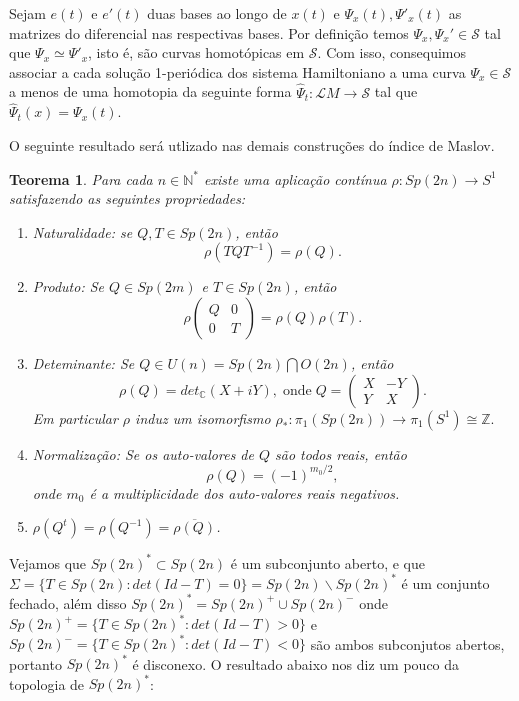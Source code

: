 \documentclass[12pt]{book}
\newtheorem{teorema}{Teorema}[section]
\newcommand{\inteiros}{\mathbb{Z}}
\newcommand{\solucoesperiodicascontrateis}{\mathcal{L}M}
\newcommand{\vermelho}[1]{{\color{red}#1}}
\begin{document}
	Sejam $e(t)$ e $e'(t)$ duas bases ao longo de $x(t)$ e $\Psi_{x}(t), \Psi'_{x}(t)$ as matrizes do diferencial nas respectivas bases. Por definição temos $\Psi_{x}, \Psi_{x}' \in \mathcal{S}$ tal que $\Psi_{x} \simeq \Psi'_{x}$, isto é, \vermelho{são curvas homotópicas em $\mathcal{S}$}. Com isso, consequimos associar a cada solução 1-periódica dos sistema Hamiltoniano a uma curva $\Psi_{x} \in \mathcal{S}$ a menos de uma homotopia da seguinte forma $\hat{\Psi}_{t}:\solucoesperiodicascontrateis \to \mathcal{S}$ tal que $\hat{\Psi}_{t}(x) = \Psi_{x}(t)$.
	
	O seguinte resultado será utlizado nas demais construções do índice de Maslov.
	
	\begin{teorema}
		Para cada $n \in \mathbb{N}^{*}$ existe uma aplicação contínua $\rho:Sp(2n) \to S^{1}$ satisfazendo as seguintes propriedades:
		\begin{enumerate}
			\item Naturalidade: se $Q, T \in Sp(2n)$, então 
			$$\rho(TQT^{-1}) = \rho(Q).$$
			\item Produto: Se $Q\in Sp(2m)$ e $T\in Sp(2n)$, então
			$$
			\rho
			\begin{pmatrix} 
			Q & 0 
			\\ 
			0 & T
			\end{pmatrix}
			= \rho(Q)\rho(T).
			$$
			\item Deteminante: Se $Q \in U(n) = Sp(2n) \bigcap O(2n)$, então
			$$
			\rho(Q) = det_{\mathbb{C}}(X+iY), \; \text{onde} \; Q = 
			\begin{pmatrix} 
			X & -Y 
			\\ 
			Y & X
			\end{pmatrix}.
			$$ 
			Em particular $\rho$ induz um isomorfismo $\rho_{*}:\pi_{1}(Sp(2n)) \to \pi_{1}(S^{1}) \cong \inteiros.$
			\item Normalização: Se os auto-valores de $Q$ são todos reais, então
			$$
			\rho(Q) = (-1)^{m_{0}/2},
			$$
			onde $m_{0}$ é a multiplicidade dos auto-valores reais negativos.
			\item $\rho(Q^{t}) = \rho(Q^{-1}) = \overline{\rho(Q)}$.
		\end{enumerate}
	\end{teorema}
	
	Vejamos que $Sp(2n)^{*} \subset Sp(2n)$ é um subconjunto aberto, e que $\Sigma = \{T\in Sp(2n): det(Id-T)=0\} = Sp(2n)\backslash Sp(2n)^{*}$ é um conjunto fechado, além disso $Sp(2n)^{*} = Sp(2n)^{+}\cup Sp(2n)^{-}$ onde $Sp(2n)^{+}=\{T\in Sp(2n)^{*}: det(Id-T)>0\} $ e $Sp(2n)^{-}=\{T\in Sp(2n)^{*}: det(Id-T)<0\}$ são ambos subconjutos abertos, portanto $Sp(2n)^{*}$ é disconexo. O resultado abaixo nos diz um pouco da topologia de $Sp(2n)^{*}$:
	
\end{document}
